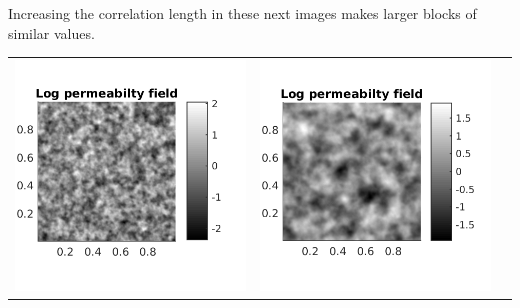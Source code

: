 \documentclass{article}
\begin{document}
Increasing the correlation length in these next images makes larger blocks of similar values.
\begin{table}[!h]
\centering
\begin{tabular}{c c c}
\includegraphics[scale=0.75]{figs/kfield_2_001_001.png} &
\includegraphics[scale=0.75]{figs/kfield_2_0025_0025.png} &

\end{tabular}
\end{table}
\end{document}
